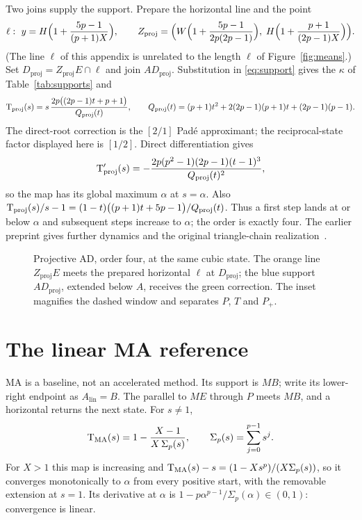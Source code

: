 Two joins supply the support. Prepare the horizontal line and the point
\[ \ell:\ y=H\Bigl(1+\frac{5p-1}{(p+1)X}\Bigr),\qquad
Z_{\mathrm{proj}}=\Bigl(W\Bigl(1+\frac{5p-1}{2p(2p-1)}\Bigr),\;H\Bigl(1+\frac{p+1}{(2p-1)X}\Bigr)\Bigr). \]
(The line $\ell$ of this appendix is unrelated to the length $\ell$ of Figure~\ref{fig:means}.) Set
$D_{\mathrm{proj}}=Z_{\mathrm{proj}}E\cap\ell$ and join $AD_{\mathrm{proj}}$. Substitution in
\eqref{eq:support} gives the $\kappa$ of Table~\ref{tab:supports} and
\begin{equation}\label{eq:proj}
\mathrm{T}_{\mathrm{proj}}(s)=s\,\frac{2p\bigl((2p-1)t+p+1\bigr)}{Q_{\mathrm{proj}}(t)},\qquad
Q_{\mathrm{proj}}(t)=(p+1)t^{2}+2(2p-1)(p+1)t+(2p-1)(p-1).
\end{equation}
The direct-root correction is the $[2/1]$ Pad\'e approximant; the reciprocal-state factor displayed
here is $[1/2]$. Direct differentiation gives
\[ \mathrm{T}_{\mathrm{proj}}'(s)=-\frac{2p(p^{2}-1)(2p-1)(t-1)^{3}}{Q_{\mathrm{proj}}(t)^{2}}, \]
so the map has its global maximum $\alpha$ at $s=\alpha$. Also
$\mathrm{T}_{\mathrm{proj}}(s)/s-1=(1-t)\bigl((p+1)t+5p-1\bigr)/Q_{\mathrm{proj}}(t)$. Thus a first step lands
at or below $\alpha$ and subsequent steps increase to $\alpha$; the order is exactly four. The
earlier preprint gives further dynamics and the original triangle-chain realization~\cite{v20}.

\begin{figure}[h]
\centering\figProjective
\caption{Projective AD, order four, at the same cubic state. The orange line $Z_{\mathrm{proj}}E$ meets
the prepared horizontal $\ell$ at $D_{\mathrm{proj}}$; the blue support $AD_{\mathrm{proj}}$, extended
below $A$, receives the green correction. The inset magnifies the dashed window and separates $P$, $T$
and $P_+$.}\label{fig:proj}
\end{figure}

\section{The linear MA reference}\label{app:ma}

MA is a baseline, not an accelerated method. Its support is $MB$; write its lower-right endpoint as
$A_{\mathrm{lin}}=B$. The parallel to $ME$ through $P$ meets $MB$, and a horizontal returns the next
state. For $s\neq1$,
\[ \mathrm{T}_{\mathrm{MA}}(s)=1-\frac{X-1}{X\,\Sigma_p(s)},\qquad \Sigma_p(s)=\sum_{j=0}^{p-1}s^{j}. \]
For $X>1$ this map is increasing and
$\mathrm{T}_{\mathrm{MA}}(s)-s=(1-Xs^{p})/(X\Sigma_p(s))$, so it converges monotonically to $\alpha$ from every
positive start, with the removable extension at $s=1$. Its derivative at $\alpha$ is
$1-p\alpha^{p-1}/\Sigma_p(\alpha)\in(0,1)$: convergence is linear.

